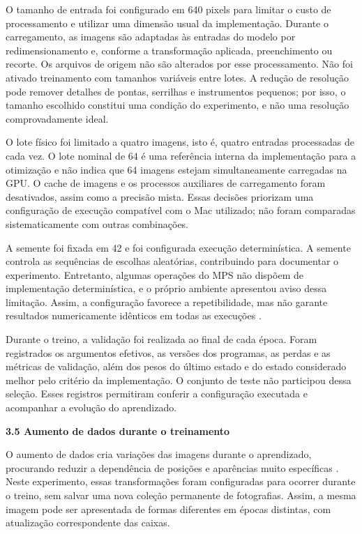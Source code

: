 O tamanho de entrada foi configurado em 640 pixels para limitar o custo de processamento e utilizar uma dimensão usual da implementação. Durante o carregamento, as imagens são adaptadas às entradas do modelo por redimensionamento e, conforme a transformação aplicada, preenchimento ou recorte. Os arquivos de origem não são alterados por esse processamento. Não foi ativado treinamento com tamanhos variáveis entre lotes. A redução de resolução pode remover detalhes de pontas, serrilhas e instrumentos pequenos; por isso, o tamanho escolhido constitui uma condição do experimento, e não uma resolução comprovadamente ideal.

O lote físico foi limitado a quatro imagens, isto é, quatro entradas processadas de cada vez. O lote nominal de 64 é uma referência interna da implementação para a otimização e não indica que 64 imagens estejam simultaneamente carregadas na GPU. O cache de imagens e os processos auxiliares de carregamento foram desativados, assim como a precisão mista. Essas decisões priorizam uma configuração de execução compatível com o Mac utilizado; não foram comparadas sistematicamente com outras combinações.

A semente foi fixada em 42 e foi configurada execução determinística. A semente controla as sequências de escolhas aleatórias, contribuindo para documentar o experimento. Entretanto, algumas operações do MPS não dispõem de implementação determinística, e o próprio ambiente apresentou aviso dessa limitação. Assim, a configuração favorece a repetibilidade, mas não garante resultados numericamente idênticos em todas as execuções \parencite{pytorchReprodutibilidade}.

Durante o treino, a validação foi realizada ao final de cada época. Foram registrados os argumentos efetivos, as versões dos programas, as perdas e as métricas de validação, além dos pesos do último estado e do estado considerado melhor pelo critério da implementação. O conjunto de teste não participou dessa seleção. Esses registros permitiram conferir a configuração executada e acompanhar a evolução do aprendizado.

\vspace{\baselineskip}
{}
\noindent\textbf{3.5 Aumento de dados durante o treinamento}\par
\nobreak\vspace{\baselineskip}\nobreak

O aumento de dados cria variações das imagens durante o aprendizado, procurando reduzir a dependência de posições e aparências muito específicas \parencite{goodfellow2016}. Neste experimento, essas transformações foram configuradas para ocorrer durante o treino, sem salvar uma nova coleção permanente de fotografias. Assim, a mesma imagem pode ser apresentada de formas diferentes em épocas distintas, com atualização correspondente das caixas.

